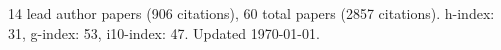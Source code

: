 14 lead author papers (906 citations),
60 total papers (2857 citations).\newline
h-index: 31, g-index: 53, i10-index: 47. Updated \today.